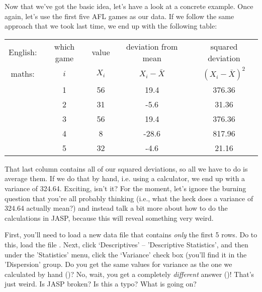 Now that we've got the basic idea, let's have a look at a concrete example. Once again, let's use the first five AFL games as our data. If we follow the same approach that we took last time, we end up with the following table:

\vspace{0.5cm}
\begin{center}
\begin{tabular}{ccccc} 
English: & which game & value & deviation from mean & squared deviation \\
maths: & $i$ & $X_i$ & $X_i - \bar{X}$ &  $(X_i - \bar{X})^2$ \\ \hline
& 1 & 56 & 19.4  & 376.36\\
& 2 & 31 &  -5.6 & 31.36\\ 
& 3 & 56 & 19.4  & 376.36\\
& 4 & 8 & -28.6  & 817.96\\
& 5 & 32 & -4.6  & 21.16 \\
\end{tabular}
\end{center}

That last column contains all of our squared deviations, so all we have to do is average them. If we do that by hand, i.e. using a calculator, we end up with a variance of 324.64. Exciting, isn't it? For the moment, let's ignore the burning question that you're all probably thinking (i.e., what the heck does a variance of 324.64 actually mean?) and instead talk a bit more about how to do the calculations in JASP, because this will reveal something very weird.

First, you'll need to load a new data file that contains \emph{only} the first 5 rows.  Do to this, load the file .  Next, click `Descriptives' -- 'Descriptive Statistics', and then under the 'Statistics' menu, click the `Variance' check box (you'll find it in the 'Dispersion' group.  Do you get the same values for variance as the one we calculated by hand ()?  No, wait, you get a completely {\it different} answer ()! That's just weird. Is JASP broken? Is this a typo? What is going on? 


